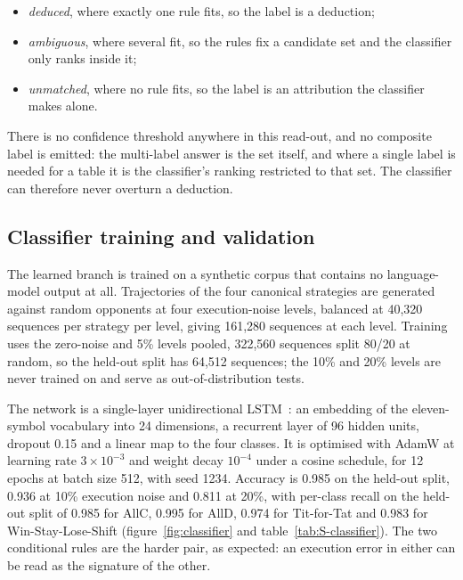 \documentclass[11pt,a4paper]{article}
\begin{document}
\begin{itemize}
\item \emph{deduced}, where exactly one rule fits, so the label is a deduction;
\item \emph{ambiguous}, where several fit, so the rules fix a candidate set and the classifier only ranks inside it;
\item \emph{unmatched}, where no rule fits, so the label is an attribution the classifier makes alone.
\end{itemize}

There is no confidence threshold anywhere in this read-out, and no composite label is emitted: the multi-label answer is the set itself, and where a single label is needed for a table it is the classifier's ranking restricted to that set. The classifier can therefore never overturn a deduction.

\subsection{Classifier training and validation}\label{appendix:classifier}

The learned branch is trained on a synthetic corpus that contains no language-model output at all. Trajectories of the four canonical strategies are generated against random opponents at four execution-noise levels, balanced at 40{,}320 sequences per strategy per level, giving 161{,}280 sequences at each level. Training uses the zero-noise and 5\% levels pooled, 322{,}560 sequences split 80/20 at random, so the held-out split has 64{,}512 sequences; the 10\% and 20\% levels are never trained on and serve as out-of-distribution tests.

The network is a single-layer unidirectional LSTM~\cite{lstm}: an embedding of the eleven-symbol vocabulary into 24 dimensions, a recurrent layer of 96 hidden units, dropout 0.15 and a linear map to the four classes. It is optimised with AdamW at learning rate $3\times10^{-3}$ and weight decay $10^{-4}$ under a cosine schedule, for 12 epochs at batch size 512, with seed 1234. Accuracy is 0.985 on the held-out split, 0.936 at 10\% execution noise and 0.811 at 20\%, with per-class recall on the held-out split of 0.985 for AllC, 0.995 for AllD, 0.974 for Tit-for-Tat and 0.983 for Win-Stay-Lose-Shift (figure~\ref{fig:classifier} and table~\ref{tab:S-classifier}). The two conditional rules are the harder pair, as expected: an execution error in either can be read as the signature of the other.
\end{document}
